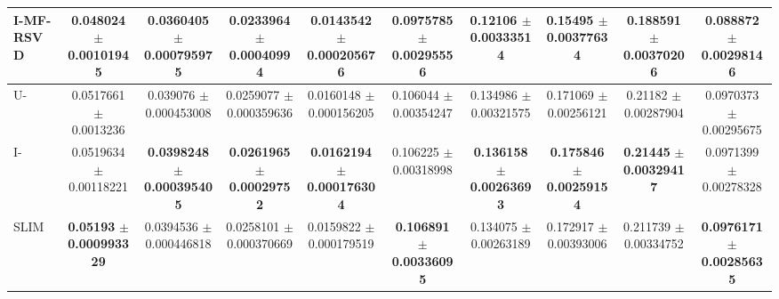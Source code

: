 \begin{table}
{\begin{tabular}{l|cccc|cccc|c}
		 I-MF-RSVD &  \num{0.048024} $\pm$ \num{0.00101945}&\num{0.0360405} $\pm$ \num{0.000795975}&\num{0.0233964} $\pm$ \num{0.00040994}&\num{0.0143542} $\pm$ \num{0.000205676}&\num{0.0975785} $\pm$ \num{0.00295556}&\num{0.12106} $\pm$ \num{0.00333514}&\num{0.15495} $\pm$ \num{0.00377634}&\num{0.188591} $\pm$ \num{0.00370206}&\num{0.088872} $\pm$ \num{0.00298146}\\
		 \hline
		U-\LinearLow &  \num{0.0517661} $\pm$ \num{0.0013236}&\num{0.039076} $\pm$ \num{0.000453008}&\num{0.0259077} $\pm$ \num{0.000359636}&\num{0.0160148} $\pm$ \num{0.000156205}&\num{0.106044} $\pm$ \num{0.00354247}&\num{0.134986} $\pm$ \num{0.00321575}&\num{0.171069} $\pm$ \num{0.00256121}&\num{0.21182} $\pm$ \num{0.00287904}&\num{0.0970373} $\pm$ \num{0.00295675}\\

		I-\LinearLow &  \num{0.0519634} $\pm$ \num{0.00118221}& \textbf{\num{0.0398248}} $\pm$ \textbf{\num{0.000395405}}&\textbf{\num{0.0261965}} $\pm$ \textbf{\num{0.00029752}}&\textbf{\num{0.0162194}} $\pm$ \textbf{\num{0.000176304}} &\num{0.106225} $\pm$ \num{0.00318998}&\textbf{\num{0.136158}} $\pm$ \textbf{\num{0.00263693}}& \textbf{\num{0.175846}} $\pm$ \textbf{\num{0.00259154}}&\textbf{\num{0.21445}} $\pm$ \textbf{\num{0.00329417}}&\num{0.0971399} $\pm$ \num{0.00278328} \\

		SLIM & \textbf{\num{0.05193}} $\pm$ \textbf{\num{0.000993329}} &\num{0.0394536} $\pm$ \num{0.000446818}&\num{0.0258101} $\pm$ \num{0.000370669}&\num{0.0159822} $\pm$ \num{0.000179519}& \textbf{\num{0.106891}} $\pm$ \textbf{\num{0.00336095}} & \num{0.134075} $\pm$ \num{0.00263189}&\num{0.172917} $\pm$ \num{0.00393006}&\num{0.211739} $\pm$ \num{0.00334752}& \textbf{\num{0.0976171}} $\pm$ \textbf{\num{0.00285635}}\\
		\hline
	\end{tabular}
}

\end{table}


